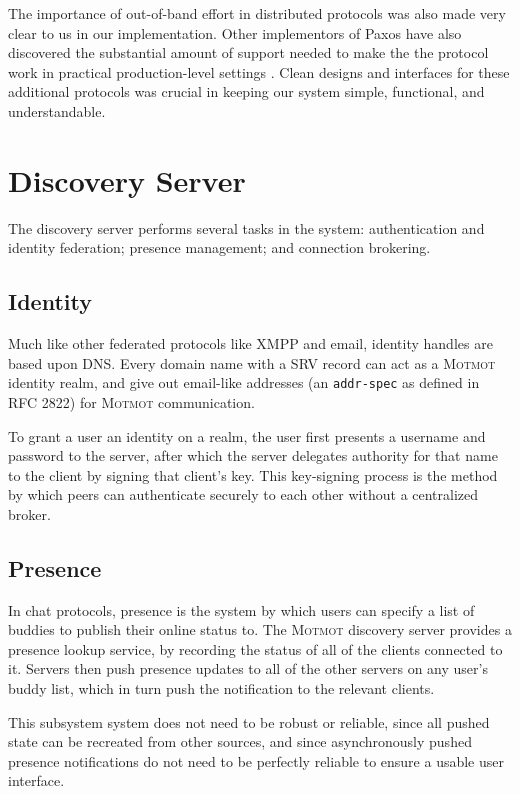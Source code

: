 \documentclass{sig-alternate}
\newcommand\Motmot{\textsc{Motmot}\xspace}
\begin{document}
The importance of out-of-band effort in distributed protocols was also made
very clear to us in our implementation.  Other implementors of Paxos have also
discovered the substantial amount of support needed to make the the protocol
work in practical production-level settings \cite{paxlive}.  Clean designs
and interfaces for these additional protocols was crucial in keeping our
system simple, functional, and understandable.

\section{Discovery Server}

The discovery server performs several tasks in the system: authentication and
identity federation; presence management; and connection brokering.

\subsection{Identity}

Much like other federated protocols like XMPP and email, identity handles are
based upon DNS. Every domain name with a SRV record can act as a \Motmot
identity realm, and give out email-like addresses (an \verb`addr-spec` as
defined in RFC 2822) for \Motmot communication.

To grant a user an identity on a realm, the user first presents a username and
password to the server, after which the server delegates authority for that name
to the client by signing that client's key. This key-signing process is the
method by which peers can authenticate securely to each other without a
centralized broker.

\subsection{Presence}

In chat protocols, presence is the system by which users can specify a list of
buddies to publish their online status to. The \Motmot discovery server provides
a presence lookup service, by recording the status of all of the clients
connected to it. Servers then push presence updates to all of the other servers
on any user's buddy list, which in turn push the notification to the relevant
clients.

This subsystem system does not need to be robust or reliable, since all pushed
state can be recreated from other sources, and since asynchronously pushed
presence notifications do not need to be perfectly reliable to ensure a usable
user interface.
\end{document}
